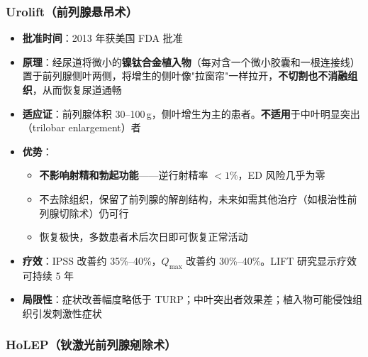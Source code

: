 \subsubsection{Urolift（前列腺悬吊术）}

\begin{itemize}[leftmargin=2cm]
	\item \textbf{批准时间}：2013 年获美国 FDA 批准
	\item \textbf{原理}：经尿道将微小的\textbf{镍钛合金植入物}（每对含一个微小胶囊和一根连接线）置于前列腺侧叶两侧，将增生的侧叶像"拉窗帘"一样拉开，\textbf{不切割也不消融组织}，从而恢复尿道通畅
	\item \textbf{适应证}：前列腺体积 30--100\,g，侧叶增生为主的患者。\textbf{不适用}于中叶明显突出（trilobar enlargement）者
	\item \textbf{优势}：
	\begin{itemize}
		\item \textbf{不影响射精和勃起功能}——逆行射精率 $<1\%$，ED 风险几乎为零
		\item 不去除组织，保留了前列腺的解剖结构，未来如需其他治疗（如根治性前列腺切除术）仍可行
		\item 恢复极快，多数患者术后次日即可恢复正常活动
	\end{itemize}
	\item \textbf{疗效}：IPSS 改善约 35\%--40\%，$Q_{\max}$ 改善约 30\%--40\%。LIFT 研究显示疗效可持续 5 年
	\item \textbf{局限性}：症状改善幅度略低于 TURP；中叶突出者效果差；植入物可能侵蚀组织引发刺激性症状
\end{itemize}

\subsubsection{HoLEP（钬激光前列腺剜除术）}

